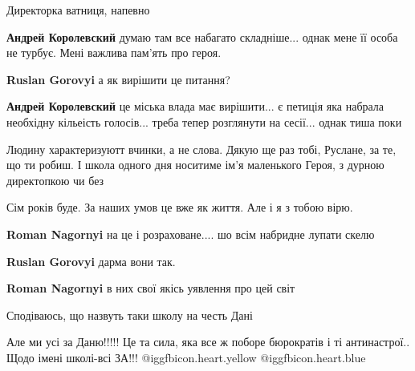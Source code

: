  
 
 
 
 
\zzSecCmt

\begin{itemize} %

Директорка ватниця, напевно

\begin{itemize} %
\textbf{Андрей Королевский} думаю там все набагато складніше... однак мене її особа не турбує. Мені важлива пам’ять про героя.

\textbf{Ruslan Gorovyi} а як вирішити це питання?

\textbf{Андрей Королевский} це міська влада має вирішити... є петиція яка набрала необхідну кільеість голосів... треба тепер розглянути на сесії... однак тиша поки
\end{itemize} %


Людину характеризуютт вчинки, а не слова. Дякую ще раз тобі, Руслане, за те, що
ти робиш. І школа одного дня носитиме ім'я маленького Героя, з дурною
директопкою чи без


Сім років буде. За наших умов це вже як життя. Але і я з тобою вірю.

\begin{itemize} %
\textbf{Roman Nagornyi} на це і розраховане.... шо всім набридне лупати скелю

\textbf{Ruslan Gorovyi} дарма вони так.

\textbf{Roman Nagornyi} в них свої якісь уявлення про цей світ
\end{itemize} %

Сподіваюсь, що назвуть таки школу на честь Дані

Але ми усі за Даню!!!!! Це та сила, яка все ж поборе бюрократів і ті
антинастрої.. Щодо імені школі-всі ЗА!!! @igg{fbicon.heart.yellow}  @igg{fbicon.heart.blue} 

\end{itemize} %

